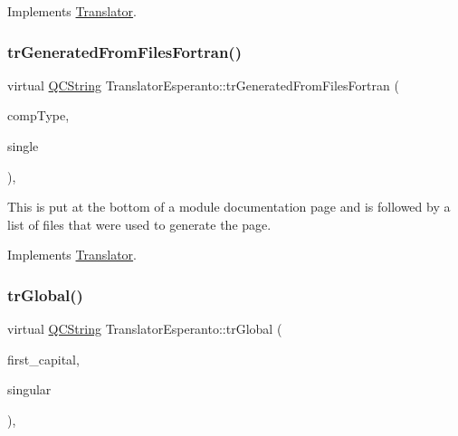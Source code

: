 Implements \mbox{\hyperlink{class_translator}{Translator}}.

\mbox{\label{class_translator_esperanto_adf797c9ded435d6664dd74389121726d}} 
\subsubsection{\texorpdfstring{trGeneratedFromFilesFortran()}{trGeneratedFromFilesFortran()}}
{\footnotesize\ttfamily virtual \mbox{\hyperlink{class_q_c_string}{Q\+C\+String}} Translator\+Esperanto\+::tr\+Generated\+From\+Files\+Fortran (\begin{DoxyParamCaption}\item[{\mbox{\hyperlink{class_class_def_ae70cf86d35fe954a94c566fbcfc87939}{Class\+Def\+::\+Compound\+Type}}}]{comp\+Type,  }\item[{bool}]{single }\end{DoxyParamCaption})\hspace{0.3cm}{\ttfamily [inline]}, {\ttfamily [virtual]}}

This is put at the bottom of a module documentation page and is followed by a list of files that were used to generate the page. 

Implements \mbox{\hyperlink{class_translator}{Translator}}.

\mbox{\label{class_translator_esperanto_aa57abfc6ad2c677dab6bfac46ea83ba1}} 
\subsubsection{\texorpdfstring{trGlobal()}{trGlobal()}}
{\footnotesize\ttfamily virtual \mbox{\hyperlink{class_q_c_string}{Q\+C\+String}} Translator\+Esperanto\+::tr\+Global (\begin{DoxyParamCaption}\item[{bool}]{first\+\_\+capital,  }\item[{bool}]{singular }\end{DoxyParamCaption})\hspace{0.3cm}{\ttfamily [inline]}, {\ttfamily [virtual]}}

